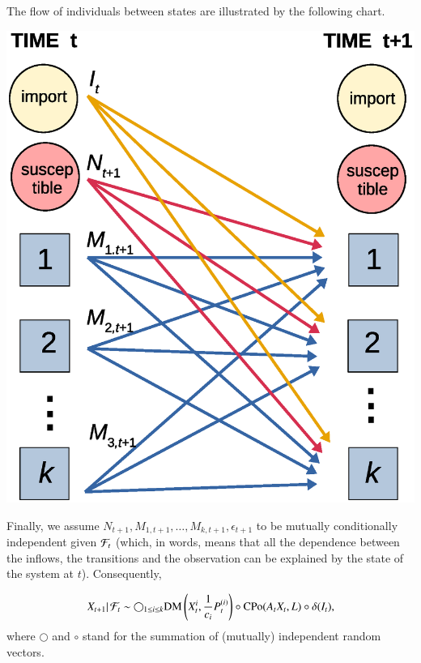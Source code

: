 \documentclass[english]{elsarticle}
\theoremstyle{plain}
\theoremstyle{remark}
\theoremstyle{plain}
\theoremstyle{definition}
\begin{document}
The flow of individuals between states are illustrated by the following
chart.
\begin{center}
\includegraphics[scale=0.3]{schema}
\par\end{center}

Finally, we assume $N_{t+1},M_{1,t+1},\dots,M_{k,t+1},\epsilon_{t+1}$
to be mutually conditionally independent given $\mathcal{F}_{t}$ (which, in
words, means that all the dependence between the inflows, the transitions
and the observation can be explained by the state of the system at
$t$). Consequently,

\[
\left.X_{t+1}\right|\mathcal{F}_{t}\sim\bigcirc_{1\leq i\leq k}\mathrm{DM}\left(X_{t}^{i},\frac{1}{c_{i}}P_{t}^{(i)}\right)\circ\mathrm{CPo}(A_{t}X_{t},L)\circ\delta(I_{t}),
\]
where $\bigcirc$ and $\circ$ stand for the summation of (mutually)
independent random vectors.
\end{document}
